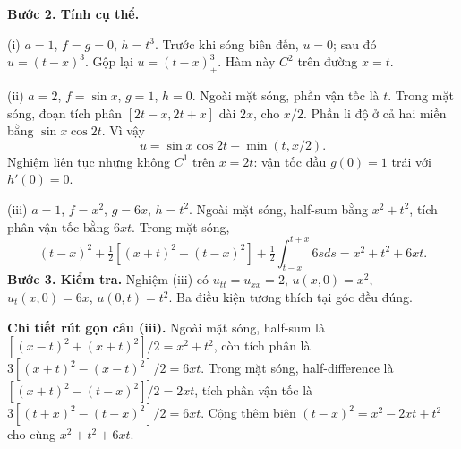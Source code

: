 \documentclass[10pt,a4paper]{article}
\begin{document}
\textbf{Bước 2. Tính cụ thể.}

(i) $a=1$, $f=g=0$, $h=t^3$. Trước khi sóng biên đến, $u=0$; sau đó $u=(t-x)^3$. Gộp lại $u=(t-x)_+^3$. Hàm này $C^2$ trên đường $x=t$.

(ii) $a=2$, $f=\sin x$, $g=1$, $h=0$. Ngoài mặt sóng, phần vận tốc là $t$. Trong mặt sóng, đoạn tích phân $[2t-x,2t+x]$ dài $2x$, cho $x/2$. Phần li độ ở cả hai miền bằng $\sin x\cos2t$. Vì vậy
\[u=\sin x\cos2t+\min(t,x/2).\]
Nghiệm liên tục nhưng không $C^1$ trên $x=2t$: vận tốc đầu $g(0)=1$ trái với $h'(0)=0$.

(iii) $a=1$, $f=x^2$, $g=6x$, $h=t^2$. Ngoài mặt sóng, half-sum bằng $x^2+t^2$, tích phân vận tốc bằng $6xt$. Trong mặt sóng,
\[(t-x)^2+\tfrac12[(x+t)^2-(t-x)^2]+\tfrac12\int_{t-x}^{t+x}6sds=x^2+t^2+6xt.\]
\textbf{Bước 3. Kiểm tra.} Nghiệm (iii) có $u_{tt}=u_{xx}=2$, $u(x,0)=x^2$, $u_t(x,0)=6x$, $u(0,t)=t^2$. Ba điều kiện tương thích tại góc đều đúng.

\textbf{Chi tiết rút gọn câu (iii).} Ngoài mặt sóng, half-sum là $[(x-t)^2+(x+t)^2]/2=x^2+t^2$, còn tích phân là $3[(x+t)^2-(x-t)^2]/2=6xt$. Trong mặt sóng, half-difference là $[(x+t)^2-(t-x)^2]/2=2xt$, tích phân vận tốc là $3[(t+x)^2-(t-x)^2]/2=6xt$. Cộng thêm biên $(t-x)^2=x^2-2xt+t^2$ cho cùng $x^2+t^2+6xt$.
\end{document}
